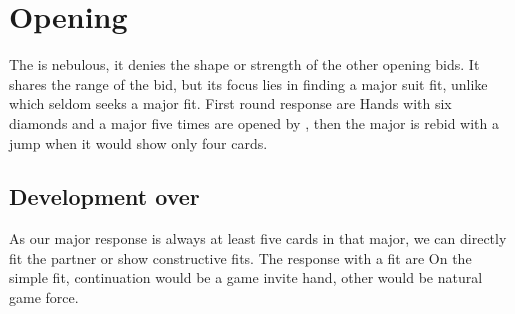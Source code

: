 \chapter{\bid{1\DS} Opening}
The \bid{1\DS} is nebulous, it denies the shape or strength of the other opening bids. It shares the range of the \bid{1\NT} bid, but its focus lies in finding a major suit fit, unlike \bid{1\NT} which seldom seeks a major fit.  %
First round response are
Hands with six diamonds and a major five times are opened by \bid{1\DS}, then the major is rebid with a jump when it would show only four cards.
\section{Development over \bid{1\HS/\SpS}}
As our major response is always at least five cards in that major, we can directly fit the partner or show constructive fits. The response with a fit are
On the simple fit, \bid{2\NT} continuation would be a game invite hand, other would be natural game force.
